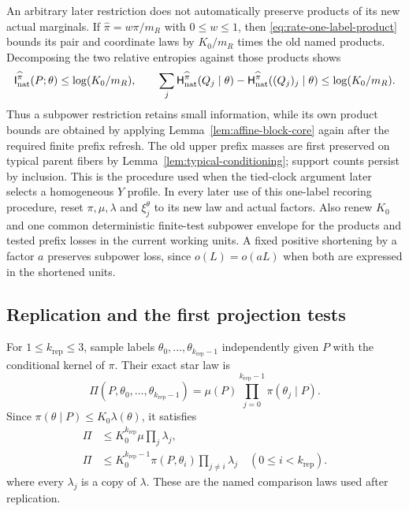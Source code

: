 An arbitrary later restriction does not automatically preserve
products of its new actual marginals.  If
$\widehat\pi=w\pi/m_R$ with $0\le w\le1$, then
\eqref{eq:rate-one-label-product} bounds its pair and coordinate
laws by $K_0/m_R$ times the old named products.  Decomposing the
two relative entropies against those products shows
\[
 \mathsf I_{\mathrm{nat}}^{\widehat\pi}(P;\theta)\le\log(K_0/m_R),\qquad
 \sum_j\mathsf H_{\mathrm{nat}}^{\widehat\pi}(Q_j\mid\theta)
       -\mathsf H_{\mathrm{nat}}^{\widehat\pi}((Q_j)_j\mid\theta)
       \le\log(K_0/m_R).
\]
Thus a subpower restriction retains small information, while its
own product bounds are obtained by applying
Lemma~\ref{lem:affine-block-core} again after the required finite
prefix refresh.  The old upper prefix masses are first preserved
on typical parent fibers by Lemma~\ref{lem:typical-conditioning};
support counts persist by inclusion.  This is the procedure used
when the tied-clock argument later selects a homogeneous $Y$ profile.
In every later use of this one-label recoring procedure, reset
$\pi,\mu,\lambda$ and $\xi_j^\theta$ to its new law and actual factors.
Also renew $K_0$ and one common deterministic finite-test subpower
envelope for the products and tested prefix losses in the current
working units.  A fixed positive shortening by a factor $a$ preserves
subpower loss, since $o(L)=o(aL)$ when both are expressed in the
shortened units.

\subsection{Replication and the first projection tests}

For $1\le k_{\mathrm{rep}}\le3$, sample labels
$\theta_0,\ldots,\theta_{k_{\mathrm{rep}}-1}$ independently given
$P$ with the conditional kernel of $\pi$.  Their exact star law is
\[
 \Pi(P,\theta_0,\ldots,\theta_{k_{\mathrm{rep}}-1})
 =\mu(P)\prod_{j=0}^{k_{\mathrm{rep}}-1}\pi(\theta_j\mid P).
\]
Since $\pi(\theta\mid P)\le K_0\lambda(\theta)$, it satisfies
\begin{equation}
 \begin{aligned}
 \Pi&\le K_0^{k_{\mathrm{rep}}}\mu\prod_j\lambda_j,\\
 \Pi&\le K_0^{k_{\mathrm{rep}}-1}
       \pi(P,\theta_i)\prod_{j\ne i}\lambda_j
       \quad(0\le i<k_{\mathrm{rep}}).
 \end{aligned}
 \label{eq:rate-star-comparisons}
\end{equation}
where every $\lambda_j$ is a copy of $\lambda$.
These are the named comparison laws used after replication.

